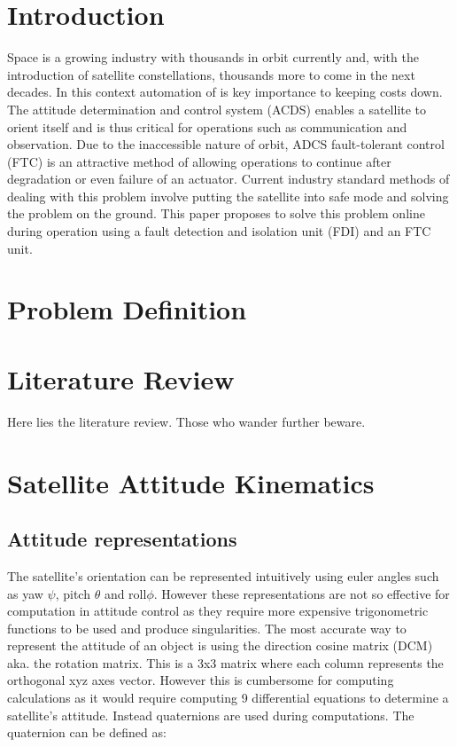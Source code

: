 \section{Introduction}

Space is a growing industry with thousands in orbit currently and, with the introduction of satellite constellations,
thousands more to come in the next decades. In this context automation of is key importance to keeping costs down. 
The attitude determination and control system (ACDS) enables a
satellite to orient itself and is thus critical for operations such as communication
and observation. Due to the inaccessible nature of orbit, ADCS fault-tolerant
control (FTC) is an attractive method of allowing operations to continue after
degradation or even failure of an actuator. Current industry standard methods
of dealing with this problem involve putting the satellite into safe mode and
solving the problem on the ground. This paper proposes to solve this problem
online during operation using a fault detection and isolation unit (FDI) and an
FTC unit.

\section{Problem Definition}

\section{Literature Review}

Here lies the literature review. Those who wander further beware.

\section{Satellite Attitude Kinematics}

\subsection{Attitude representations}
The satellite's orientation can be represented intuitively using euler angles such as yaw $\psi$, pitch $\theta$ and roll$\phi$.
However these representations are not so effective for computation in attitude control as they require more expensive trigonometric
functions to be used and produce singularities. The most accurate way to represent the attitude of an object is using the direction
cosine matrix (DCM) aka. the rotation matrix. This is a 3x3 matrix where each column represents the orthogonal xyz axes vector. However
this is cumbersome for computing calculations as it would require computing 9 differential equations to determine a satellite's 
attitude. Instead quaternions are used during computations. The quaternion can be defined as:

